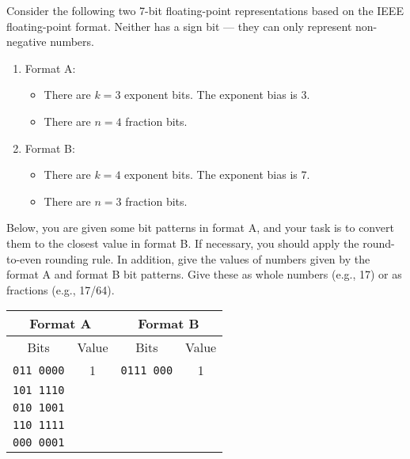 \documentclass[12pt]{article}
\newenvironment{ex}[2][Exercise]{\begin{trivlist}
		\item[\hskip \labelsep {\bfseries #1}\hskip \labelsep {\bfseries #2.}]}{\end{trivlist}}
\begin{document}
\begin{ex}{2.52}
	Consider the following two 7-bit floating-point representations based on the IEEE
	floating-point format. Neither has a sign bit --- they can only represent non-negative
	numbers.
	\begin{enumerate}
		\item Format A:
		\begin{itemize}
			\item There are $k=3$ exponent bits. The exponent bias is 3.
			\item There are $n=4$ fraction bits.
		\end{itemize}
		\item Format B:
		\begin{itemize}
			\item There are $k=4$ exponent bits. The exponent bias is 7.
			\item There are $n=3$ fraction bits.
		\end{itemize}
	\end{enumerate}
	Below, you are given some bit patterns in format A, and your task is to convert them
	to the closest value in format B. If necessary, you should apply the round-to-even
	rounding rule. In addition, give the values of numbers given by the format A and format
	B bit patterns. Give these as whole numbers (e.g., 17) or as fractions (e.g., 17/64).
	\begin{center}
		\begin{tabular}{cc|cc}
			\multicolumn{2}{c}{Format A} & \multicolumn{2}{c}{Format B}\\
			\hline
			Bits & Value & Bits & Value\\
			\hline
			\texttt{011 0000} & 1 & \texttt{0111 000} & 1 \\
			
			\texttt{101 1110} & \makebox[1cm]{\hrulefill} & \makebox[1cm]{\hrulefill} & \makebox[1cm]{\hrulefill}\\
			
			\texttt{010 1001} & \makebox[1cm]{\hrulefill} & \makebox[1cm]{\hrulefill} & \makebox[1cm]{\hrulefill}\\
			
			\texttt{110 1111} & \makebox[1cm]{\hrulefill} & \makebox[1cm]{\hrulefill} & \makebox[1cm]{\hrulefill}\\
			
			\texttt{000 0001} & \makebox[1cm]{\hrulefill} & \makebox[1cm]{\hrulefill} & \makebox[1cm]{\hrulefill}\\
		\end{tabular}
	\end{center}
\end{ex}
\end{document}

